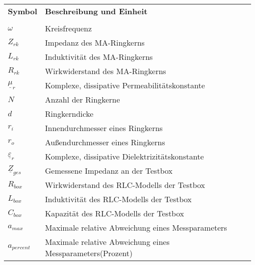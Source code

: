 \begin{tabular}{p{} p{}}
\textbf{Symbol} & \textbf{Beschreibung und Einheit}\\
 & \\
$\omega$ & Kreisfrequenz \\

$Z_{rk}$ & Impedanz des MA-Ringkerns \\
$L_{rk}$ & Induktivit\"at des MA-Ringkerns \\
$R_{rk}$ & Wirkwiderstand des MA-Ringkerns \\
$\underline{\mu}_r$ & Komplexe, dissipative Permeabilit\"atskonstante\\
$N$ & Anzahl der Ringkerne\\
$d$ & Ringkerndicke\\
$r_i$ & Innendurchmesser eines Ringkerns \\
$r_o$ & Au\ss{}endurchmesser eines Ringkerns \\
$\underline{\varepsilon}_r$ & Komplexe, dissipative Dielektrizit\"atskonstante\\
$\underline{Z}_{ges}$ & Gemessene Impedanz an der Testbox \\
$R_{box}$ & Wirkwiderstand des RLC-Modells der Testbox \\
$L_{box}$ & Induktivit\"at des RLC-Modells der Testbox \\
$C_{box}$ & Kapazit\"at des RLC-Modells der Testbox \\
$a_{max}$ & Maximale relative Abweichung eines Messparameters \\
$a_{percent}$ & Maximale relative Abweichung eines Messparameters(Prozent) \\


\end{tabular}
